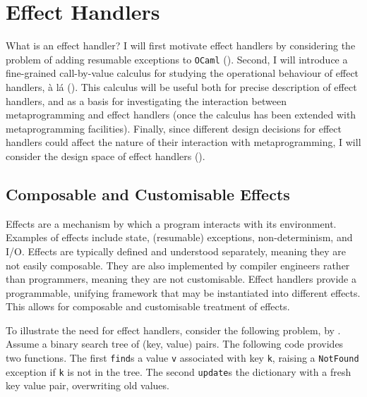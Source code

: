 

\section{Effect Handlers}\label{section:effects-technical}
What is an effect handler? I will first motivate effect handlers by considering the problem of adding resumable exceptions to \texttt{OCaml} (). Second, I will introduce a fine-grained call-by-value calculus for studying the operational behaviour of effect handlers, à lá \citet{pretnar-15} (). This calculus will be useful both for precise description of effect handlers, and as a basis for investigating the interaction between metaprogramming and effect handlers (once the calculus has been extended with metaprogramming facilities). Finally, since different design decisions for effect handlers could affect the nature of their interaction with metaprogramming, I will consider the design space of effect handlers ().

\subsection{Composable and Customisable Effects}\label{subsection:effect-handler-motivation}
Effects are a mechanism by which a program interacts with its environment. Examples of effects include state, (resumable) exceptions, non-determinism, and I/O. Effects are typically defined and understood separately, meaning they are not easily composable. They are also implemented by compiler engineers rather than programmers, meaning they are not customisable. Effect handlers provide a programmable, unifying framework that may be instantiated into different effects. This allows for composable and customisable treatment of effects.

To illustrate the need for effect handlers, consider the following problem, by \citet{kiselyov-2012}. Assume a binary search tree of (key, value) pairs. The following code provides two functions. The first \texttt{find}s a value \texttt{v} associated with key \texttt{k}, raising a \texttt{NotFound} exception if \texttt{k} is not in the tree. The second \texttt{update}s the dictionary with a fresh key value pair, overwriting old values.


